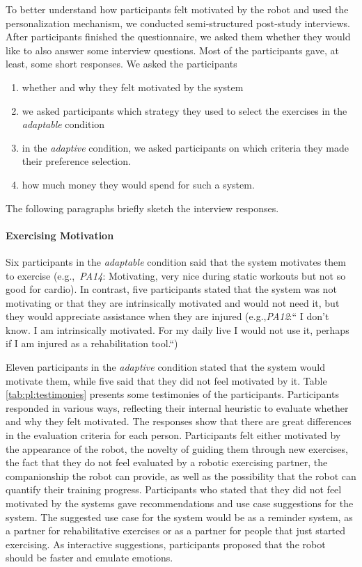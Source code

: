 \documentclass[twocolumn]{svjour3}          %
\begin{document}
To better understand how participants felt motivated by the robot and used the personalization mechanism, we conducted semi-structured post-study interviews. After participants finished the questionnaire, we asked them whether they would like to also answer some interview questions. Most of the participants gave, at least, some short responses. We asked the participants
\begin{enumerate}
 \item whether and why they felt motivated by the system 
 \item we asked participants which strategy they used to select the exercises in the \textit{adaptable} condition
 \item in the \textit{adaptive} condition, we asked participants on which criteria they made their preference selection.
 \item how much money they would spend for such a system.
\end{enumerate}
The following paragraphs briefly sketch the interview responses.


\paragraph{Exercising Motivation}
Six participants in the \textit{adaptable} condition said that the system motivates them to exercise (e.g.,~\textit{PA14}: Motivating, very nice during static workouts but not so good for cardio). In contrast, five participants stated that the system was not motivating or that they are intrinsically motivated and would not need it, but they would appreciate assistance when they are injured (e.g.,\textit{PA12}:`` I don't know. I am intrinsically motivated. For my daily live I would not use it, perhaps if I am injured as a rehabilitation tool.``)

Eleven participants in the \textit{adaptive} condition stated that the system would motivate them, while five said that they did not feel motivated by it. 
Table \ref{tab:pl:testimonies} presents some testimonies of the participants. Participants responded in various ways, reflecting their internal heuristic to evaluate whether and why they felt motivated. The responses show that there are great differences in the evaluation criteria for each person. Participants felt either motivated by the appearance of the robot, the novelty of guiding them through new exercises, the fact that they do not feel evaluated by a robotic exercising partner, the companionship the robot can provide, as well as the possibility that the robot can quantify their training progress. Participants who stated that they did not feel motivated by the systems gave recommendations and use case suggestions for the system. The suggested use case for the system would be as a reminder system, as a partner for rehabilitative exercises or as a partner for people that just started exercising. As interactive suggestions, participants proposed that the robot should be faster and emulate emotions.   
\end{document}
